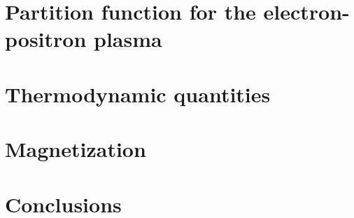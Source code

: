 \documentclass[a4paper]{article}
\begin{document}
\section{Partition function for the electron-positron plasma}

\section{Thermodynamic quantities}

\section{Magnetization}

\section{Conclusions}




\end{document}
